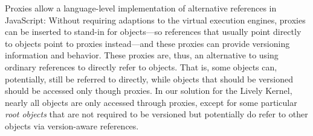 % 
% 



Proxies allow a language-level implementation of alternative references in JavaScript:
Without requiring adaptions to the virtual execution engines, proxies can be inserted to stand-in for objects---so references that usually point directly to objects point to proxies instead---and these proxies can provide versioning information and behavior.
These proxies are, thus, an alternative to using ordinary references to directly refer to objects.
That is, some objects can, potentially, still be referred to directly, while objects that should be versioned should be accessed only though proxies.
In our solution for the Lively Kernel, nearly all objects are only accessed through proxies, except for some particular \emph{root objects} that are not required to be versioned but potentially do refer to other objects via version-aware references.

